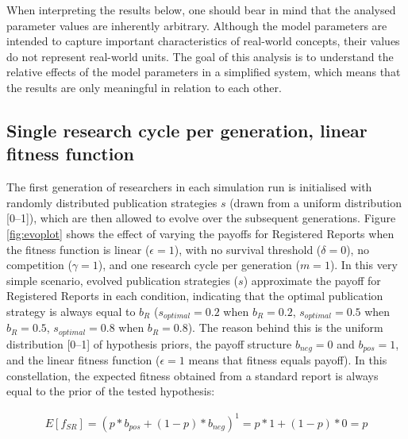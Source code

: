 \documentclass[
  ,man,mask,floatsintext]{apa6}
\begin{document}
When interpreting the results below, one should bear in mind that the analysed parameter values are inherently arbitrary.
Although the model parameters are intended to capture important characteristics of real-world concepts, their values do not represent real-world units.
The goal of this analysis is to understand the relative effects of the model parameters in a simplified system, which means that the results are only meaningful in relation to each other.

\hypertarget{single-research-cycle-per-generation-linear-fitness-function}{%
\subsection{Single research cycle per generation, linear fitness function}\label{single-research-cycle-per-generation-linear-fitness-function}}

The first generation of researchers in each simulation run is initialised with randomly distributed publication strategies \(s\) (drawn from a uniform distribution {[}0--1{]}), which are then allowed to evolve over the subsequent generations.
Figure \ref{fig:evoplot} shows the effect of varying the payoffs for Registered Reports when the fitness function is linear (\(\epsilon = 1\)), with no survival threshold (\(\delta = 0\)), no competition (\(\gamma = 1\)), and one research cycle per generation (\(m = 1\)).
In this very simple scenario, evolved publication strategies (\(s\)) approximate the payoff for Registered Reports in each condition, indicating that the optimal publication strategy is always equal to \(b_{R}\) (\(s_{optimal} = 0.2\) when \(b_{R} = 0.2\), \(s_{optimal} = 0.5\) when \(b_{R} = 0.5\), \(s_{optimal} = 0.8\) when \(b_{R} = 0.8\)).
The reason behind this is the uniform distribution {[}0--1{]} of hypothesis priors, the payoff structure \(b_{neg} = 0\) and \(b_{pos} = 1\), and the linear fitness function (\(\epsilon = 1\) means that fitness equals payoff).
In this constellation, the expected fitness obtained from a standard report is always equal to the prior of the tested hypothesis:

\begin{align}
E[f_{SR}] = (p * b_{pos} + (1-p) * b_{neg})^1 = p * 1 +  (1-p) * 0 = p
\end{align}
\end{document}
